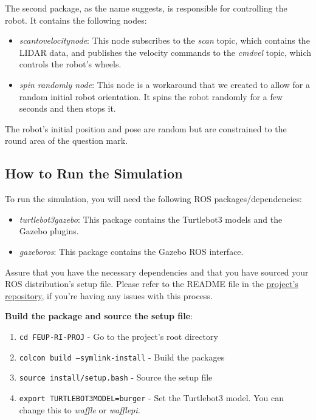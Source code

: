 \documentclass[conference]{IEEEtran}
\begin{document}
The second package, as the name suggests, is responsible for controlling the robot. It contains the following nodes:
\begin{itemize}
    \item \emph{scan\textunderscore to\textunderscore velocity\textunderscore node}: This node subscribes to
          the \emph{scan} topic, which contains the LIDAR data, and publishes the velocity commands to
          the \emph{cmd\textunderscore vel} topic, which controls the robot's wheels.
    \item \emph{spin \textunderscore randomly \textunderscore node}: This node is a workaround that we created to allow for a random initial
          robot orientation. It spins the robot randomly for a few seconds and then stops it.
\end{itemize}

The robot's initial position and pose are random but are constrained to the round area of the question mark.

\subsection{How to Run the Simulation}\label{sec:run}

To run the simulation, you will need the following ROS packages/dependencies:

\begin{itemize}
    \item \emph{turtlebot3\textunderscore gazebo}: This package contains the Turtlebot3 models and the Gazebo plugins.
    \item \emph{gazebo\textunderscore ros}: This package contains the Gazebo ROS interface.
\end{itemize}

Assure that you have the necessary dependencies and that you have sourced your ROS distribution's setup file. Please refer to the README file in the \href{https://github.com/carlosverissimo3001/FEUP-RI-PROJ/}{project's repository}, if you're having any issues with this process.

\vskip 0.1in

\textbf{Build the package and source the setup file}:

\begin{enumerate}
    \item \texttt{cd FEUP-RI-PROJ} - Go to the project's root directory
    \item \texttt{colcon build --symlink-install} - Build the packages
    \item \texttt{source install/setup.bash} - Source the setup file
    \item \texttt{export TURTLEBOT3\textunderscore MODEL=burger} - Set the Turtlebot3 model.
          You can change this to \emph{waffle} or \emph{waffle\textunderscore pi.}
\end{enumerate}
\end{document}
